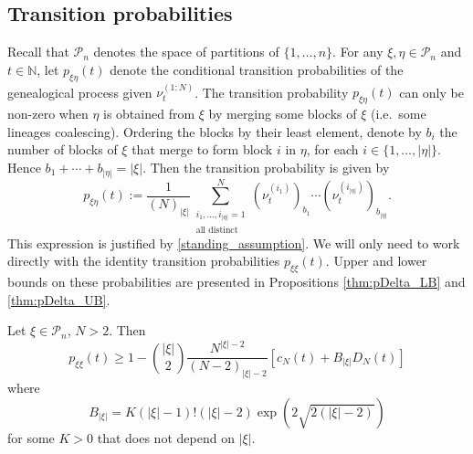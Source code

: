 \subsection{Transition probabilities}
Recall that $\mathcal{P}_n$ denotes the space of partitions of $\{1,\dots,n\}$.
For any $\xi, \eta \in \mathcal{P}_n$ and $t\in\mathbb{N}$, let $p_{\xi\eta}(t)$ denote the conditional transition probabilities of the genealogical process given $\nu_t^{(1:N)}$. %
The transition probability $p_{\xi\eta}(t)$ can only be non-zero when $\eta$ is obtained from $\xi$ by merging some blocks of $\xi$ (i.e.\ some lineages coalescing).
Ordering the blocks by their least element, denote by $b_i$ the number of blocks of $\xi$ that merge to form block $i$ in $\eta$, for each $i \in \{1,\dots, |\eta|\}$. Hence $b_1 + \cdots + b_{|\eta|} = |\xi|$.
Then the transition probability is given by
\begin{equation}\label{eq:defn_pxieta}
p_{\xi\eta}(t) 
:= \frac{1}{(N)_{|\xi|}} \sum_{\substack{i_1 , \ldots , i_{|\eta|} =1 
        \\ \text{all distinct} }}^N
        (\nu_t^{(i_1)})_{b_1} \cdots (\nu_t^{(i_{|\eta|})})_{b_{|\eta|}} .
\end{equation}
This expression is justified by \ref{standing_assumption}.
We will only need to work directly with the identity transition probabilities $p_{\xi\xi}(t)$.
Upper and lower bounds on these probabilities are presented in Propositions \ref{thm:pDelta_LB} and \ref{thm:pDelta_UB}.
\begin{prop}%
\label{thm:pDelta_LB}
Let $\xi \in \mathcal{P}_n$, $N>2$. Then
\begin{equation*}
p_{\xi\xi}(t)
\geq 1 - \binom{|\xi|}{2} \frac{N^{|\xi|-2}}{(N-2)_{|\xi|-2}} \left[ c_N(t) + B_{|\xi|} D_N(t) \right]
\end{equation*}
where 
\begin{equation*}
B_{|\xi|} = K (|\xi|-1)! (|\xi|-2) \exp( 2 \sqrt{2(|\xi|-2)} )
\end{equation*}
for some $K>0$ that does not depend on $|\xi|$.
\end{prop}
